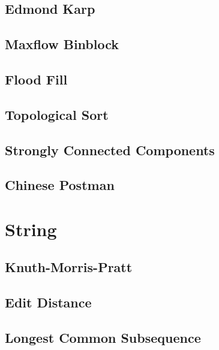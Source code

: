 \documentclass[a4paper,landscape,8pt]{article}
\begin{document}
\begin{multicols}{2}
\subsection{Edmond Karp}


\subsection{Maxflow Binblock}


\subsection{Flood Fill}


\subsection{Topological Sort}


\subsection{Strongly Connected Components}


\subsection{Chinese Postman}



\section{String}

\subsection{Knuth-Morris-Pratt}


\subsection{Edit Distance}


\subsection{Longest Common Subsequence}



\end{multicols}
\end{document}
